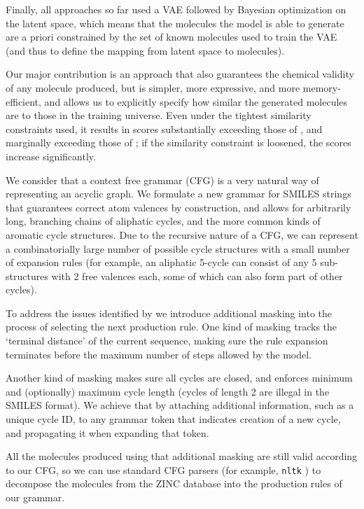 \documentclass[11pt]{article}
\begin{document}
Finally, all approaches so far used a VAE \cite{kingsmawelling14} followed by Bayesian optimization on the latent space, which means that the molecules the model is able to generate are a priori constrained by the set of known molecules used to train the VAE (and thus to define the mapping from latent space to molecules).
 
Our major contribution is an approach that also guarantees the chemical validity of any molecule produced, but is simpler, more expressive, and more memory-efficient, and allows us to explicitly specify how similar the generated molecules are to those in the training universe. Even under the tightest similarity constraints used, it results in scores substantially exceeding those of \cite{jin18}, and marginally exceeding those of \cite{kajino18}; if the similarity constraint is loosened, the scores increase significantly.
 
We consider that a context free grammar (CFG) is a very natural way of representing an acyclic graph. We formulate a new grammar for SMILES strings that guarantees correct atom valences by construction, and allows for arbitrarily long, branching chains of aliphatic cycles, and the more common kinds of aromatic cycle structures. Due to the recursive nature of a CFG, we can represent a combinatorially large number of possible cycle structures with a small number of expansion rules (for example, an aliphatic 5-cycle can consist of any 5 sub-structures with 2 free valences each, some of which can also form part of other cycles).
 
To address the issues identified by \cite{kusner17}  we introduce additional masking into the process of selecting the next production rule. One kind of masking tracks the `terminal distance' of the current sequence, making sure the rule expansion terminates before the maximum number of steps allowed by the model. 
 
Another kind of masking makes sure all cycles are closed, and enforces minimum and (optionally) maximum cycle length (cycles of length 2 are illegal in the SMILES format). We achieve that by attaching additional information, such as a unique cycle ID, to any grammar token that indicates creation of a new cycle, and propagating it when expanding that token.
 
All the molecules produced using that additional masking are still valid according to our CFG, so we can use standard CFG parsers (for example, \verb|nltk| \cite{BirdKleinLoper09NLTK}) to decompose the molecules from the ZINC database \cite{Weininger88} into the production rules of our grammar.
 
\end{document}
